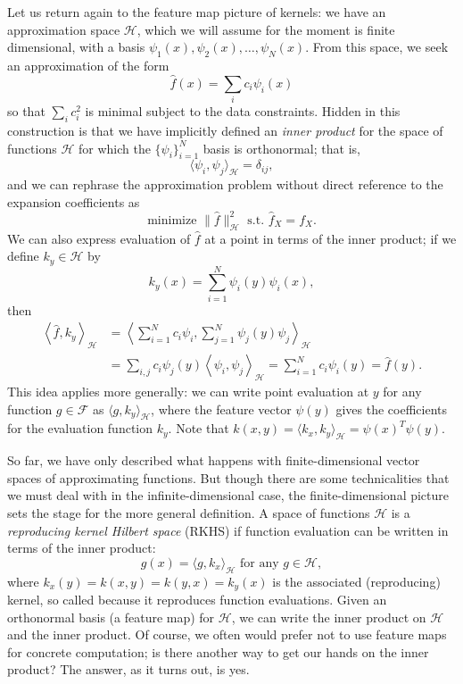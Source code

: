 \documentclass[12pt, leqno]{article} %
\begin{document}
Let us return again to the feature map picture of kernels: we have an
approximation space $\mathcal{H}$, which we will assume for the moment
is finite dimensional, with a basis $\psi_1(x), \psi_2(x), \ldots,
\psi_N(x)$.  From this space, we seek an approximation of the form
\[
  \hat{f}(x) = \sum_i c_i \psi_i(x)
\]
so that $\sum_i c_i^2$ is minimal subject to the data constraints.
Hidden in this construction is that we have implicitly defined an
{\em inner product} for the space of functions $\mathcal{H}$
for which the $\{ \psi_i \}_{i=1}^N$ basis is orthonormal; that is,
\[
  \langle \psi_i, \psi_j \rangle_{\mathcal{H}} = \delta_{ij},
\]
and we can rephrase the approximation problem without direct reference to
the expansion coefficients as
\[
  \mbox{minimize } \|\hat{f}\|_{\mathcal{H}}^2
  \mbox{ s.t.~} \hat{f}_X = f_X.
\]
We can also express evaluation of $\hat{f}$ at a point in terms of the
inner product; if we define $k_y \in \mathcal{H}$ by
\[
  k_y(x) = \sum_{i=1}^N \psi_i(y) \psi_i(x),
\]
then
\begin{align*}
  \left\langle \hat{f}, k_y \right\rangle_{\mathcal{H}} 
   &= \left\langle \sum_{i=1}^N c_i \psi_i,
             \sum_{j=1}^N \psi_j(y) \psi_j \right\rangle_{\mathcal{H}} \\
   & = \sum_{i,j} c_i \psi_j(y) \left\langle \psi_i, \psi_j \right\rangle_{\mathcal{H}} 
   = \sum_{i=1}^N c_i \psi_i(y) = \hat{f}(y).
\end{align*}
This idea applies more generally: we can write point evaluation at $y$
for any function $g \in \mathcal{F}$ as $\langle g, k_y \rangle_{\mathcal{H}}$,
where the feature vector $\psi(y)$ gives the coefficients for the
evaluation function $k_y$.  Note that
$k(x,y) = \langle k_x, k_y \rangle_{\mathcal{H}} = \psi(x)^T \psi(y)$.

So far, we have only described what happens with finite-dimensional
vector spaces of approximating functions.  But though there are some
technicalities that we must deal with in the infinite-dimensional
case, the finite-dimensional picture sets the stage for the more
general definition.
A space of functions $\mathcal{H}$ is a
{\em reproducing kernel Hilbert space} (RKHS)
if function evaluation can be written in terms of the inner product:
\[
  g(x) = \langle g, k_x \rangle_{\mathcal{H}}
  \mbox{ for any } g \in \mathcal{H},
\]
where $k_x(y) = k(x,y) = k(y,x) = k_y(x)$ is the associated
(reproducing) kernel, so called because it reproduces function
evaluations.  Given an orthonormal basis (a feature map)
for $\mathcal{H}$, we can write the inner product on $\mathcal{H}$
and the inner product.  Of course, we often would prefer not to use
feature maps for concrete computation; is there another way to
get our hands on the inner product?  The answer, as it turns out,
is yes.
\end{document}
